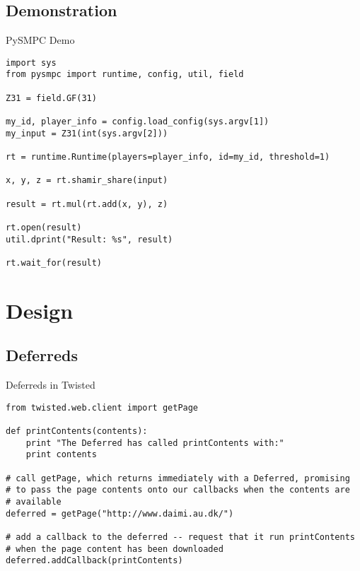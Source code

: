\documentclass[t]{beamer}
\begin{document}
\subsection{Demonstration}

\begin{frame}[fragile]{PySMPC Demo}

\begin{lstlisting}
import sys
from pysmpc import runtime, config, util, field

Z31 = field.GF(31)

my_id, player_info = config.load_config(sys.argv[1])
my_input = Z31(int(sys.argv[2]))

rt = runtime.Runtime(players=player_info, id=my_id, threshold=1)

x, y, z = rt.shamir_share(input)

result = rt.mul(rt.add(x, y), z)

rt.open(result)
util.dprint("Result: %s", result)

rt.wait_for(result)
\end{lstlisting}

\end{frame}



\section{Design}

\subsection{Deferreds}

\begin{frame}[fragile]{Deferreds in Twisted}%

\begin{lstlisting}
from twisted.web.client import getPage

def printContents(contents):
    print "The Deferred has called printContents with:"
    print contents

# call getPage, which returns immediately with a Deferred, promising
# to pass the page contents onto our callbacks when the contents are
# available
deferred = getPage("http://www.daimi.au.dk/")

# add a callback to the deferred -- request that it run printContents
# when the page content has been downloaded
deferred.addCallback(printContents)
\end{lstlisting}

\end{frame}
\end{document}

